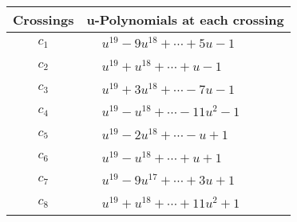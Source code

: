 \documentclass[1p]{elsarticle_modified}
\theoremstyle{definition}
\begin{document}
\begin{tabular}{m{50pt}|m{274pt}}
Crossings & \hspace{64pt}u-Polynomials at each crossing \\
\hline $$\begin{aligned}c_{1}\end{aligned}$$&$\begin{aligned}
&u^{19}-9 u^{18}+\cdots+5 u-1
\end{aligned}$\\
\hline $$\begin{aligned}c_{2}\end{aligned}$$&$\begin{aligned}
&u^{19}+u^{18}+\cdots+u-1
\end{aligned}$\\
\hline $$\begin{aligned}c_{3}\end{aligned}$$&$\begin{aligned}
&u^{19}+3 u^{18}+\cdots-7 u-1
\end{aligned}$\\
\hline $$\begin{aligned}c_{4}\end{aligned}$$&$\begin{aligned}
&u^{19}- u^{18}+\cdots-11 u^2-1
\end{aligned}$\\
\hline $$\begin{aligned}c_{5}\end{aligned}$$&$\begin{aligned}
&u^{19}-2 u^{18}+\cdots- u+1
\end{aligned}$\\
\hline $$\begin{aligned}c_{6}\end{aligned}$$&$\begin{aligned}
&u^{19}- u^{18}+\cdots+u+1
\end{aligned}$\\
\hline $$\begin{aligned}c_{7}\end{aligned}$$&$\begin{aligned}
&u^{19}-9 u^{17}+\cdots+3 u+1
\end{aligned}$\\
\hline $$\begin{aligned}c_{8}\end{aligned}$$&$\begin{aligned}
&u^{19}+u^{18}+\cdots+11 u^2+1
\end{aligned}$\\

\end{tabular}
\end{document}
